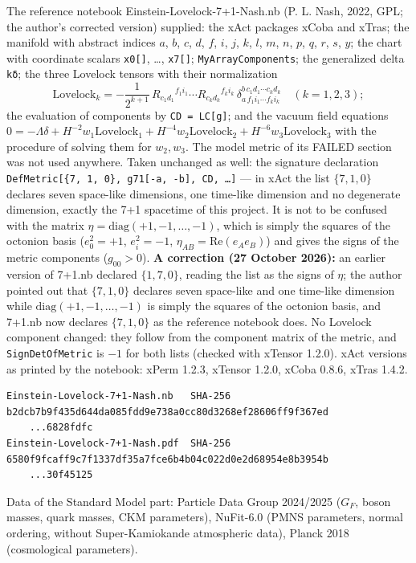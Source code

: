 \documentclass[10pt,a4paper]{article}
\begin{document}
The reference notebook Einstein-Lovelock-7+1-Nash.nb (P. L. Nash, 2022, GPL; the author’s corrected version) supplied: the xAct packages xCoba and xTras; the manifold with abstract indices $a$, $b$, $c$, $d$, $f$, $i$, $j$, $k$, $l$, $m$, $n$, $p$, $q$, $r$, $s$, $y$; the chart with coordinate scalars \texttt{x0[]}, …, \texttt{x7[]}; \texttt{MyArrayComponents}; the generalized delta \texttt{kδ}; the three Lovelock tensors with their normalization
\begin{equation*}
\mathrm{Lovelock}_k=-\frac1{2^{k+1}}\,R_{c_1d_1}{}^{f_1i_1}\cdots R_{c_kd_k}{}^{f_ki_k}\,\delta^{b\,c_1d_1\cdots c_kd_k}_{a\,f_1i_1\cdots f_ki_k}\quad(k=1,2,3);
\end{equation*}
the evaluation of components by \texttt{CD = LC[g]}; and the vacuum field equations $0=-\Lambda\delta+H^{-2}w_1\mathrm{Lovelock}_1+H^{-4}w_2\mathrm{Lovelock}_2+H^{-6}w_3\mathrm{Lovelock}_3$ with the procedure of solving them for $w_2,w_3$. The model metric of its FAILED section was not used anywhere. Taken unchanged as well: the signature declaration \texttt{DefMetric[\{7, 1, 0\}, g71[-a, -b], CD, …]} — in xAct the list $\{7,1,0\}$ declares seven space-like dimensions, one time-like dimension and no degenerate dimension, exactly the 7+1 spacetime of this project. It is not to be confused with the matrix $\eta=\mathrm{diag}(+1,-1,\dots,-1)$, which is simply the squares of the octonion basis ($e_0^2=+1$, $e_i^2=-1$, $\eta_{AB}=\mathrm{Re}(e_Ae_B)$) and gives the signs of the metric components ($g_{00}>0$). \textbf{A correction (27 October 2026):} an earlier version of 7+1.nb declared $\{1,7,0\}$, reading the list as the signs of $\eta$; the author pointed out that $\{7,1,0\}$ declares seven space-like and one time-like dimension while $\mathrm{diag}(+1,-1,\dots,-1)$ is simply the squares of the octonion basis, and 7+1.nb now declares $\{7,1,0\}$ as the reference notebook does. No Lovelock component changed: they follow from the component matrix of the metric, and \texttt{SignDetOfMetric} is $-1$ for both lists (checked with xTensor 1.2.0). xAct versions as printed by the notebook: xPerm 1.2.3, xTensor 1.2.0, xCoba 0.8.6, xTras 1.4.2.

\begin{Verbatim}[fontsize=\small,frame=single,framesep=2mm]
Einstein-Lovelock-7+1-Nash.nb   SHA-256 b2dcb7b9f435d644da085fdd9e738a0cc80d3268ef28606ff9f367ed
    ...6828fdfc
Einstein-Lovelock-7+1-Nash.pdf  SHA-256 6580f9fcaff9c7f1337df35a7fce6b4b04c022d0e2d68954e8b3954b
    ...30f45125
\end{Verbatim}
Data of the Standard Model part: Particle Data Group 2024/2025 ($G_F$, boson masses, quark masses, CKM parameters), NuFit-6.0 (PMNS parameters, normal ordering, without Super-Kamiokande atmospheric data), Planck 2018 (cosmological parameters).
\end{document}
